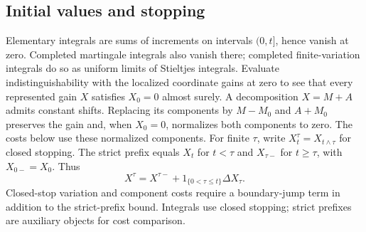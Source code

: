 \subsection{Initial values and stopping}
Elementary integrals are sums of increments on intervals $(0,t]$, hence
vanish at zero. Completed martingale integrals also vanish there; completed
finite-variation integrals do so as uniform limits of Stieltjes integrals.
Evaluate indistinguishability with the localized coordinate gains at zero
to see that every represented gain $X$ satisfies $X_0=0$ almost surely.
A decomposition $X=M+A$ admits constant shifts. Replacing its components by
$M-M_0$ and $A+M_0$ preserves the gain and, when $X_0=0$, normalizes both
components to zero. The costs below use these normalized components.
For finite $\tau$, write $X^\tau_t=X_{t\wedge\tau}$ for closed stopping.
The strict prefix equals $X_t$ for $t<\tau$ and $X_{\tau-}$ for $t\geq\tau$,
with $X_{0-}=X_0$. Thus
\[
 X^\tau=X^{\tau-}+1_{\{0<\tau\leq t\}}\Delta X_\tau.
\]
Closed-stop variation and component costs require a boundary-jump term in
addition to the strict-prefix bound. Integrals use closed stopping;
strict prefixes are auxiliary objects for cost comparison.
